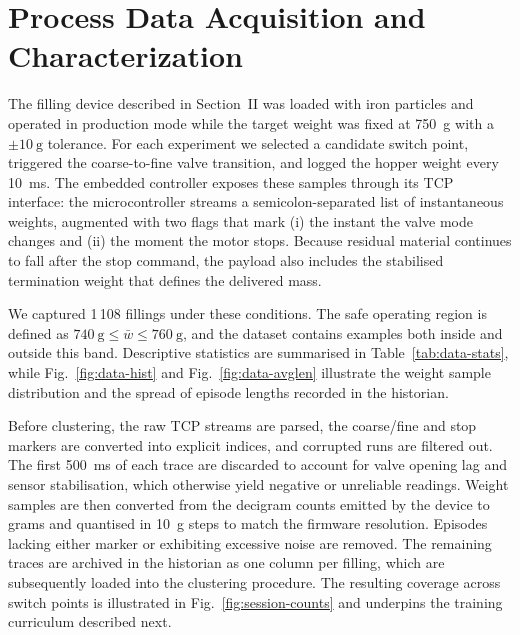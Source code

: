 \documentclass[journal]{IEEEtranTIE}
\begin{document}
\section{Process Data Acquisition and Characterization}
The filling device described in Section~II was loaded with iron particles and operated in production mode while the target weight was fixed at \SI{750}{\gram} with a $\pm\SI{10}{\gram}$ tolerance. For each experiment we selected a candidate switch point, triggered the coarse-to-fine valve transition, and logged the hopper weight every \SI{10}{\milli\second}. The embedded controller exposes these samples through its TCP interface: the microcontroller streams a semicolon-separated list of instantaneous weights, augmented with two flags that mark (i) the instant the valve mode changes and (ii) the moment the motor stops. Because residual material continues to fall after the stop command, the payload also includes the stabilised termination weight that defines the delivered mass.

We captured 1\,108 fillings under these conditions. The safe operating region is defined as $\SI{740}{\gram} \le \bar{w} \le \SI{760}{\gram}$, and the dataset contains examples both inside and outside this band. Descriptive statistics are summarised in Table~\ref{tab:data-stats}, while Fig.~\ref{fig:data-hist} and Fig.~\ref{fig:data-avglen} illustrate the weight sample distribution and the spread of episode lengths recorded in the historian.

Before clustering, the raw TCP streams are parsed, the coarse/fine and stop markers are converted into explicit indices, and corrupted runs are filtered out. The first \SI{500}{\milli\second} of each trace are discarded to account for valve opening lag and sensor stabilisation, which otherwise yield negative or unreliable readings. Weight samples are then converted from the decigram counts emitted by the device to grams and quantised in \SI{10}{\gram} steps to match the firmware resolution. Episodes lacking either marker or exhibiting excessive noise are removed. The remaining traces are archived in the historian as one column per filling, which are subsequently loaded into the clustering procedure. The resulting coverage across switch points is illustrated in Fig.~\ref{fig:session-counts} and underpins the training curriculum described next.
\end{document}
